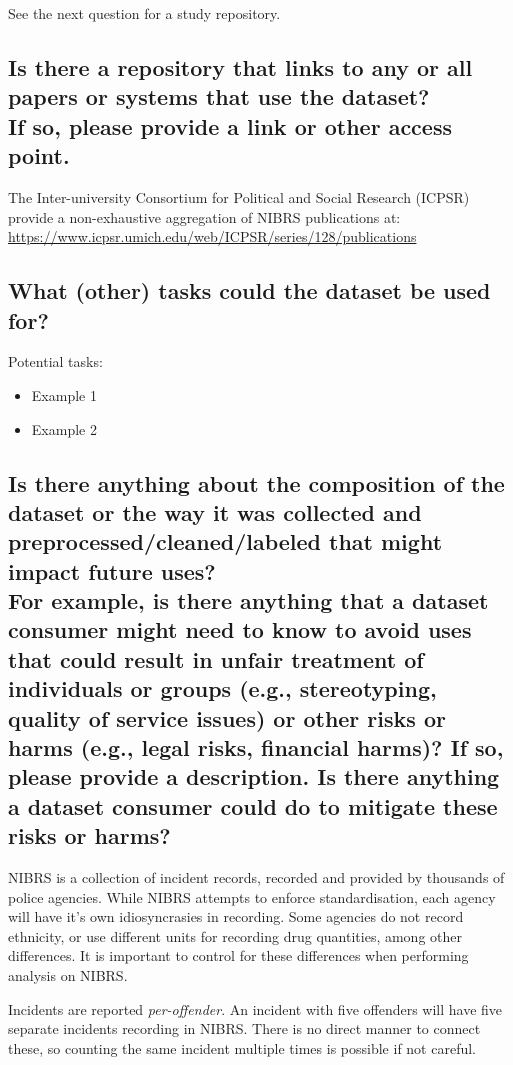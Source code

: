 \documentclass[letterpaper, 10 pt, conference]{ieeeconf}  %
\newcommand{\subtitle}[1]{{\\ \small \normalfont \color{purple} #1}}
\begin{document}
See the next question for a study repository.

\subsection{Is there a repository that links to any or all papers or systems that use the dataset? \subtitle{If so, please provide a link or other access point. }}

The Inter-university Consortium for Political and Social Research (ICPSR) provide a non-exhaustive aggregation of NIBRS publications at: \\
\href{https://www.icpsr.umich.edu/web/ICPSR/series/128/publications}{https://www.icpsr.umich.edu/web/ICPSR/series/128/publications}


\subsection{What (other) tasks could the dataset be used for?}

Potential tasks:

\begin{itemize}
    \item Example 1
    \item Example 2
\end{itemize}

\subsection{Is there anything about the composition of the dataset or the way it was collected and preprocessed/cleaned/labeled that might impact future uses? \subtitle{For example, is there anything that a dataset consumer might need to know to avoid uses that could result in unfair treatment of individuals or groups (e.g., stereotyping, quality of service issues) or other risks or harms (e.g., legal risks, financial harms)? If so, please provide a description. Is there anything a dataset consumer could do to mitigate these risks or harms?}}

NIBRS is a collection of incident records, recorded and provided by thousands of police agencies. While NIBRS attempts to enforce standardisation, each agency will have it's own idiosyncrasies in recording. Some agencies do not record ethnicity, or use different units for recording drug quantities, among other differences. It is important to control for these differences when performing analysis on NIBRS.

Incidents are reported \textit{per-offender}. An incident with five offenders will have five separate incidents recording in NIBRS. There is no direct manner to connect these, so counting the same incident multiple times is possible if not careful.
\end{document}
